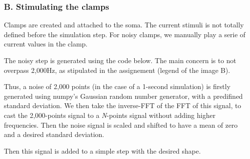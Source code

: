 \documentclass[]{article}
\newenvironment{Shaded}{}{}
\newcommand{\BuiltInTok}[1]{#1}
\newcommand{\CommentTok}[1]{\textcolor[rgb]{0.38,0.63,0.69}{\textit{#1}}}
\newcommand{\ControlFlowTok}[1]{\textcolor[rgb]{0.00,0.44,0.13}{\textbf{#1}}}
\newcommand{\DecValTok}[1]{\textcolor[rgb]{0.25,0.63,0.44}{#1}}
\newcommand{\FloatTok}[1]{\textcolor[rgb]{0.25,0.63,0.44}{#1}}
\newcommand{\KeywordTok}[1]{\textcolor[rgb]{0.00,0.44,0.13}{\textbf{#1}}}
\newcommand{\NormalTok}[1]{#1}
\newcommand{\OperatorTok}[1]{\textcolor[rgb]{0.40,0.40,0.40}{#1}}
\begin{document}
\hypertarget{b.-stimulating-the-clamps}{%
\subsubsection{B. Stimulating the
clamps}\label{b.-stimulating-the-clamps}}

Clamps are created and attached to the soma. The current stimuli is not
totally defined before the simulation step. For noisy clamps, we
manually play a serie of current values in the clamp.

The noisy step is generated using the code below. The main concern is to
not overpass 2,000Hz, as stipulated in the assignement (legend of the
image B).

Thus, a noise of 2,000 points (in the case of a 1-second simulation) is
firstly generated using numpy's Gaussian random number generator, with a
predifined standard deviation. We then take the inverse-FFT of the FFT
of this signal, to cast the 2,000-points signal to a \emph{N}-points
signal without adding higher frequencies. Then the noise signal is
scaled and shifted to have a mean of zero and a desired standard
deviation.

Then this signal is added to a simple step with the desired shape.

\begin{Shaded}
\end{Shaded}
\end{document}
